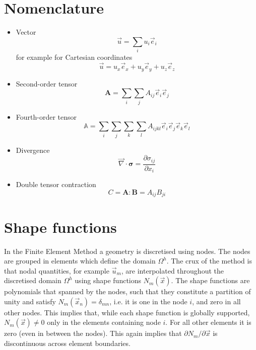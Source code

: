 \documentclass[times,namecite]{goose-article}
\begin{document}
\appendix

\section{Nomenclature}

\begin{itemize}
  \item Vector
  \begin{equation}
    \vec{u} = \sum\limits_i u_i \vec{e}_i
  \end{equation}
  for example for Cartesian coordinates
  \begin{equation}
    \vec{u} = u_x \vec{e}_x + u_y \vec{e}_y + u_z \vec{e}_z
  \end{equation}
  \item Second-order tensor
  \begin{equation}
    \bm{A} = \sum\limits_i \sum\limits_j A_{ij} \vec{e}_i \vec{e}_j
  \end{equation}
  \item Fourth-order tensor
  \begin{equation}
    \mathbb{A} = \sum\limits_i \sum\limits_j \sum\limits_k \sum\limits_l A_{ijkl} \vec{e}_i \vec{e}_j \vec{e}_k \vec{e}_l
  \end{equation}
  \item Divergence
  \begin{equation}
    \vec{\nabla} \cdot \bm{\sigma} = \frac{ \partial \sigma_{ij} }{ \partial x_i }
  \end{equation}
  \item Double tensor contraction
  \begin{equation}
    C = \bm{A} : \bm{B} = A_{ij} B_{ji}
  \end{equation}
\end{itemize}

\section{Shape functions}

In the Finite Element Method a geometry is discretised using nodes. The nodes are grouped in elements which define the domain $\Omega^h$. The crux of the method is that nodal quantities, for example $\vec{u}_m$, are interpolated throughout the discretised domain $\Omega^h$ using shape functions $N_m (\vec{x})$. The shape functions are polynomials that spanned by the nodes, such that they constitute a partition of unity and satisfy $N_m (\vec{x}_n) = \delta_{mn}$, i.e. it is one in the node $i$, and zero in all other nodes. This implies that, while each shape function is globally supported, $N_m (\vec{x}) \neq 0$ only in the elements containing node $i$. For all other elements it is zero (even in between the nodes). This again implies that $\partial N_m / \partial \vec{x}$ is discontinuous across element boundaries.
\end{document}
